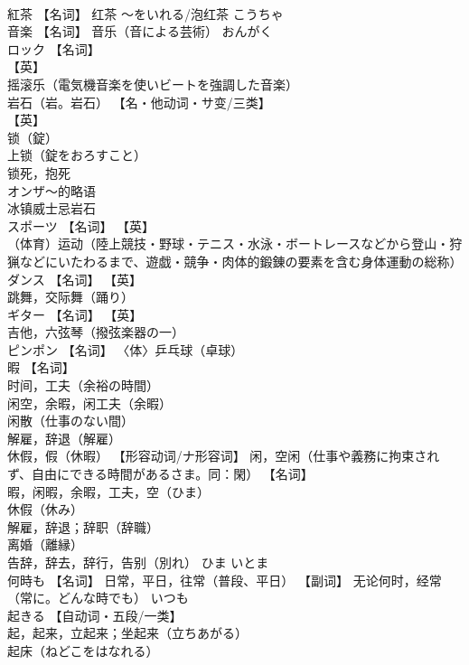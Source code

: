 \documentclass[8pt]{extreport}
\begin{document}
\begin{CJK}{UTF8}{min}
\\	紅茶	【名词】 红茶 ～をいれる/泡红茶	こうちゃ	
\\	音楽	【名词】 音乐（音による芸術）	おんがく	
\\	ロック	【名词】 
\\	【英】
\\	摇滚乐（電気機音楽を使いビートを強調した音楽） 
\\	岩石（岩。岩石） 【名・他动词・サ变/三类】 
\\	【英】
\\	锁（錠） 
\\	上锁（錠をおろすこと） 
\\	锁死，抱死 
\\	オンザ〜的略语 
\\	冰镇威士忌岩石		
\\	スポーツ	【名词】 【英】
\\	（体育）运动（陸上競技・野球・テニス・水泳・ボートレースなどから登山・狩猟などにいたわるまで、遊戯・競争・肉体的鍛錬の要素を含む身体運動の総称）		
\\	ダンス	【名词】 【英】
\\	跳舞，交际舞（踊り）		
\\	ギター	【名词】 【英】
\\	吉他，六弦琴（撥弦楽器の一）		
\\	ピンポン	【名词】 〈体〉乒乓球（卓球）		
\\	暇	【名词】 
\\	时间，工夫（余裕の時間） 
\\	闲空，余暇，闲工夫（余暇） 
\\	闲散（仕事のない間） 
\\	解雇，辞退（解雇） 
\\	休假，假（休暇） 【形容动词/ナ形容词】 闲，空闲（仕事や義務に拘束されず、自由にできる時間があるさま。同：閑） 【名词】 
\\	暇，闲暇，余暇，工夫，空（ひま） 
\\	休假（休み） 
\\	解雇，辞退；辞职（辞職） 
\\	离婚（離縁） 
\\	告辞，辞去，辞行，告别（別れ）	ひま いとま	
\\	何時も	【名词】 日常，平日，往常（普段、平日） 【副词】 无论何时，经常（常に。どんな時でも）	いつも	
\\	起きる	【自动词・五段/一类】 
\\	起，起来，立起来；坐起来（立ちあがる） 
\\	起床（ねどこをはなれる） 

\end{CJK}
\end{document}
